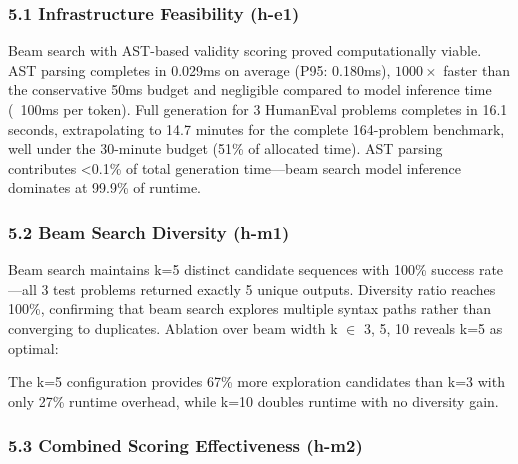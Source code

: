
\subsubsection{5.1 Infrastructure Feasibility (h-e1)}

Beam search with AST-based validity scoring proved computationally viable. AST parsing completes in 0.029ms on average (P95: 0.180ms), $1000\times$ faster than the conservative 50ms budget and negligible compared to model inference time (~100ms per token). Full generation for 3 HumanEval problems completes in 16.1 seconds, extrapolating to 14.7 minutes for the complete 164-problem benchmark, well under the 30-minute budget (51\% of allocated time). AST parsing contributes <0.1\% of total generation time---beam search model inference dominates at 99.9\% of runtime.

\subsubsection{5.2 Beam Search Diversity (h-m1)}

Beam search maintains k=5 distinct candidate sequences with 100\% success rate---all 3 test problems returned exactly 5 unique outputs. Diversity ratio reaches 100\%, confirming that beam search explores multiple syntax paths rather than converging to duplicates. Ablation over beam width k $\in$ {3, 5, 10} reveals k=5 as optimal:

\begin{table}[htbp]
\centering
{}
\end{table}

The k=5 configuration provides 67\% more exploration candidates than k=3 with only 27\% runtime overhead, while k=10 doubles runtime with no diversity gain.

\subsubsection{5.3 Combined Scoring Effectiveness (h-m2)}

